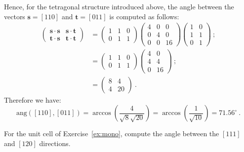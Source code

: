 \begin{example}
Hence, for the tetragonal structure introduced above, the angle between the vectors $\mathbf{s}=[110]$ and $\mathbf{t}=[011]$ is computed as follows:
\begin{align*}
	\left(\begin{array}{cc}\mathbf{s}\cdot\mathbf{s}&\mathbf{s}\cdot\mathbf{t}\\
	\mathbf{t}\cdot\mathbf{s}&\mathbf{t}\cdot\mathbf{t}\end{array}\right) &= \left(\begin{array}{ccc}1 & 1 & 0\\ 0 & 1 & 1\end{array}\right)
	\left(\begin{array}{ccc}
			4 & 0 & 0\\
			0 & 4 & 0\\
			0 & 0 & 16\end{array}\right)\left(\begin{array}{cc} 1 & 0\\ 1 & 1\\ 0 & 1\end{array}\right)\ ;\\
	&= \left(\begin{array}{ccc}1 & 1 & 0\\ 0 & 1 & 1\end{array}\right)
	\left(\begin{array}{cc} 4 & 0\\ 4 & 4\\ 0 & 16\end{array}\right)\ ; \\
	&= \left(\begin{array}{cc}8 & 4 \\ 4 & 20 \end{array}\right)\ .
\end{align*}
Therefore we have:
\[
	\text{ang}([110],[011]) = \arccos\left(\frac{4}{\sqrt{8}\sqrt{20}}\right) = \arccos\left(\frac{1}{\sqrt{10}}\right) = 71.56^{\circ}\ .
\]
\end{example}

\begin{exercise}
For the unit cell of Exercise~\ref{ex:mono}, compute the angle between the $[111]$ and $[120]$ directions.
\end{exercise}

